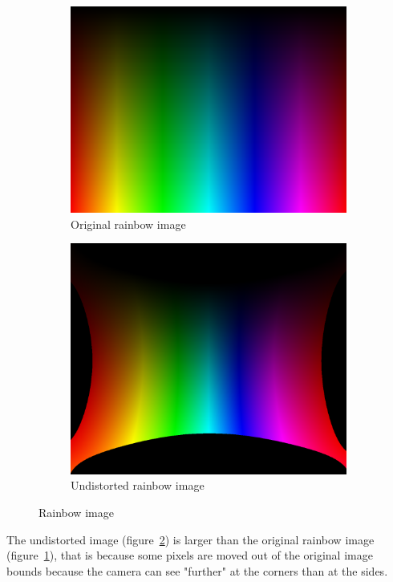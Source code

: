 \begin{figure}[H]
    \centering
    \begin{subfigure}{.5\textwidth}
        \centering
        \includegraphics[width=.8\textwidth]{../photos/original_rainbow}
        \caption[originalRainbow]{Original rainbow image}
        \label{fig:original_rainbow}
    \end{subfigure}%
    \begin{subfigure}{.5\textwidth}
        \centering
        \includegraphics[width=.8\textwidth]{../photos/undistorted_rainbow}
        \caption[originalRainbow]{Undistorted rainbow image}
        \label{fig:undistorted_rainbow}
    \end{subfigure}
    \caption{Rainbow image}
    \label{fig:original_undistorted_rainbow}
\end{figure}
The undistorted image (figure~\ref{fig:undistorted_rainbow}) is larger than the original rainbow image (figure~\ref{fig:original_rainbow}), that is because some pixels are moved out of the original image bounds because the camera can see "further" at the corners than at the sides.
